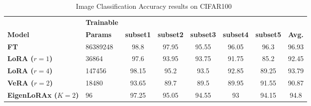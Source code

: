 \begin{table}[h]
    \centering
    \caption{Image Classification Accuracy results on CIFAR100~\citep{cifar100}}
    \begin{tabular}{llcccccc}
        \toprule
         & \textbf{Trainable} & &  &  &  &  & \\
        \textbf{Model} & \textbf{Params} & \textbf{subset1} & \textbf{subset2} & \textbf{subset3} & \textbf{subset4} & \textbf{subset5} & \textbf{Avg.} \\ 
        \midrule
        \textbf{FT}             & 86389248             & 98.8                        & 97.95                       & 95.55                       & 96.05                       & 96.3                        & 96.93                       \\
        \textbf{LoRA ($r=1$)}   & 36864                & 97.6                        & 93.95                       & 93.75                       & 91.75                       & 85.2                        & 92.45                       \\
        \textbf{LoRA ($r=4$)}   & 147456               & 98.15                       & 95.2                        & 93.5                        & 92.85                       & 89.25                       & 93.79                       \\
        \textbf{VeRA ($r=2$)}   & 18480                & 93.65                       & 89.7                        & 89.5                        & 89.95                       & 91.55                       & 90.87                       \\
        \textbf{EigenLoRAx ($K=2$)} & 96                   & 97.25                       & 95.05                       & 94.55                       & 93                          & 94.15                       & 94.8                        \\
            \bottomrule
    \end{tabular}
    \label{tab:appendix_cifar100}
\end{table}


